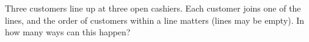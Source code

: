 Three customers line up at three open cashiers. Each customer joins one of the lines, and the order of customers within a line matters (lines may be empty). In how many ways can this happen?
